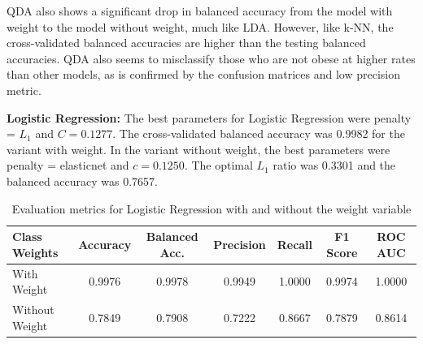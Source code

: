 \documentclass[a4paper,12pt]{article}
\begin{document}
QDA also shows a significant drop in balanced accuracy from the model with weight to the model without weight, much like LDA. However, like k-NN, the cross-validated balanced accuracies are higher than the testing balanced accuracies. QDA also seems to misclassify those who are not obese at higher rates than other models, as is confirmed by the confusion matrices and low precision metric.

\textbf{Logistic Regression:}
The best parameters for Logistic Regression were penalty = $L_1$ and $C = 0.1277$. The cross-validated balanced accuracy was 0.9982 for the variant with weight. In the variant without weight, the best parameters were penalty = elasticnet and $c= 0.1250$. The optimal $L_1$ ratio was 0.3301 and the balanced accuracy was 0.7657.


\begin{table}[H]
\centering
\small
\begin{tabular}{lcccccc}
\toprule
\textbf{Class Weights} & \textbf{Accuracy} & \textbf{Balanced Acc.} & \textbf{Precision} & \textbf{Recall} & \textbf{F1 Score} & \textbf{ROC AUC} \\
\midrule
With Weight & 0.9976 & 0.9978 & 0.9949 & 1.0000 & 0.9974 & 1.0000 \\
Without Weight & 0.7849 & 0.7908 & 0.7222 & 0.8667 & 0.7879 & 0.8614 \\
\bottomrule
\end{tabular}
\caption{Evaluation metrics for Logistic Regression with and without the weight variable}
\label{tab:logreg_weights}
\end{table}
\end{document}
